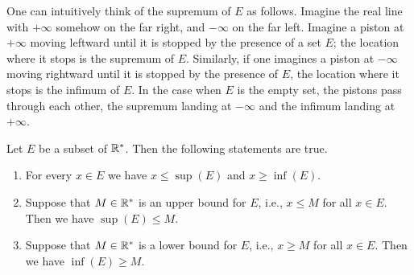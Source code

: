 \begin{note}
  One can intuitively think of the supremum of \(E\) as follows.
  Imagine the real line with \(+\infty\) somehow on the far right, and \(-\infty\) on the far left.
  Imagine a piston at \(+\infty\) moving leftward until it is stopped by the presence of a set \(E\);
  the location where it stops is the supremum of \(E\).
  Similarly, if one imagines a piston at \(-\infty\) moving rightward until it is stopped by the presence of \(E\), the location where it stops is the infimum of \(E\).
  In the case when \(E\) is the empty set, the pistons pass through each other, the supremum landing at \(-\infty\) and the infimum landing at \(+\infty\).
\end{note}

\begin{thm}\label{i:6.2.11}
  Let \(E\) be a subset of \(\mathbb{R}^*\).
  Then the following statements are true.
  \begin{enumerate}
    \item For every \(x \in E\) we have \(x \leq \sup(E)\) and \(x \geq \inf(E)\).
    \item Suppose that \(M \in \mathbb{R}^*\) is an upper bound for \(E\), i.e., \(x \leq M\) for all \(x \in E\).
          Then we have \(\sup(E) \leq M\).
    \item Suppose that \(M \in \mathbb{R}^*\) is a lower bound for \(E\), i.e., \(x \geq M\) for all \(x \in E\).
          Then we have \(\inf(E) \geq M\).
  \end{enumerate}
\end{thm}

